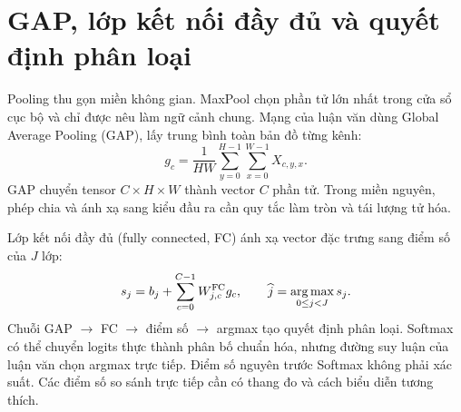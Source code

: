\section{GAP, lớp kết nối đầy đủ và quyết định phân loại}
Pooling thu gọn miền không gian. MaxPool chọn phần tử lớn nhất trong cửa sổ cục bộ và chỉ được nêu làm ngữ cảnh chung. Mạng của luận văn dùng Global Average Pooling (GAP), lấy trung bình toàn bản đồ từng kênh:
\begin{equation}
 g_c=\frac{1}{HW}\sum_{y=0}^{H-1}\sum_{x=0}^{W-1}X_{c,y,x}.
\end{equation}
GAP chuyển tensor $C\times H\times W$ thành vector $C$ phần tử. Trong miền nguyên, phép chia và ánh xạ sang kiểu đầu ra cần quy tắc làm tròn và tái lượng tử hóa.

Lớp kết nối đầy đủ (fully connected, FC) ánh xạ vector đặc trưng sang điểm số của $J$ lớp:
\begin{equation}
 s_j=b_j+\sum_{c=0}^{C-1}W^{\rm FC}_{j,c}g_c,
 \qquad \widehat{j}=\operatorname*{arg\,max}_{0\leq j<J}s_j.
\end{equation}
Chuỗi GAP $\rightarrow$ FC $\rightarrow$ điểm số $\rightarrow$ argmax tạo quyết định phân loại. Softmax có thể chuyển logits thực thành phân bố chuẩn hóa, nhưng đường suy luận của luận văn chọn argmax trực tiếp. Điểm số nguyên trước Softmax không phải xác suất. Các điểm số so sánh trực tiếp cần có thang đo và cách biểu diễn tương thích.
